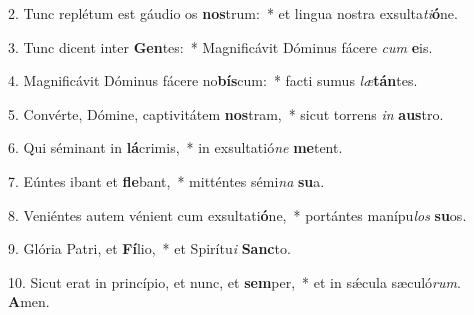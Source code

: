 2. Tunc replétum est gáudio os \textbf{nos}trum:~*  et lingua nostra exsulta\textit{ti}\textbf{ó}ne.\

3. Tunc dicent inter \textbf{Gen}tes:~*  Magnificávit Dóminus fácere \textit{cum} \textbf{e}is.\

4. Magnificávit Dóminus fácere no\textbf{bís}cum:~*  facti sumus \textit{læ}\textbf{tán}tes.\

5. Convérte, Dómine, captivitátem \textbf{nos}tram,~*  sicut torrens \textit{in} \textbf{aus}tro.\

6. Qui séminant in \textbf{lá}crimis,~*  in exsultatió\textit{ne} \textbf{me}tent.\

7. Eúntes ibant et \textbf{fle}bant,~*  mitténtes sémi\textit{na} \textbf{su}a.\

8. Veniéntes autem vénient cum exsultati\textbf{ó}ne,~*  portántes manípu\textit{los} \textbf{su}os.\

9. Glória Patri, et \textbf{Fí}lio,~*  et Spirítu\textit{i} \textbf{Sanc}to.\

10. Sicut erat in princípio, et nunc, et \textbf{sem}per,~*  et in sǽcula sæculó\textit{rum}. \textbf{A}men.\

